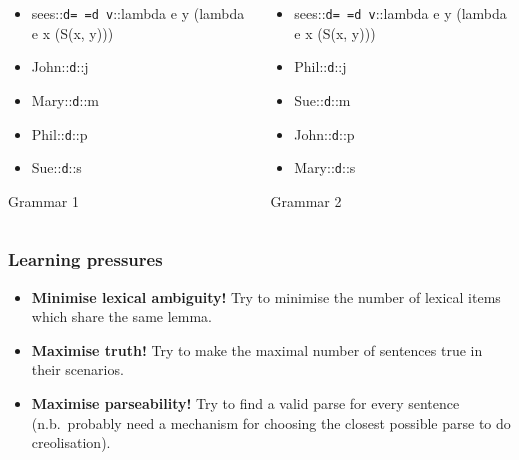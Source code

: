 \documentclass[aspectratio=169]{beamer}
\newcommand{\lex}[3]{{#1}::{\texttt{#2}}::{#3}}
\begin{document}
\begin{frame}
  \begin{columns}
  \begin{column}{0.5\textwidth}
  \begin{itemize}
    \item \lex{sees}{d=~=d~v}{lambda e y (lambda e x (S(x, y)))}
    \item \lex{John}{d}{j}
    \item \lex{Mary}{d}{m}
    \item \lex{Phil}{d}{p}
    \item \lex{Sue}{d}{s}
  \end{itemize}
  {Grammar 1}
  \end{column}
  \begin{column}{0.5\textwidth}
  \begin{itemize}
    \item \lex{sees}{d=~=d~v}{lambda e y (lambda e x (S(x, y)))}
    \item \lex{Phil}{d}{j}
    \item \lex{Sue}{d}{m}
    \item \lex{John}{d}{p}
    \item \lex{Mary}{d}{s}
  \end{itemize}
  {Grammar 2}
  \end{column}

  \end{columns}
\end{frame}
%
%
\begin{frame}
\frametitle{Learning pressures}
\begin{itemize}
  \item \textbf{Minimise lexical ambiguity!} Try to minimise the number of lexical items which share the same lemma.
  \item \textbf{Maximise truth!} Try to make the maximal number of sentences true in their scenarios.
  \item \textbf{Maximise parseability!} Try to find a valid parse for every sentence (n.b.\ probably need a mechanism for choosing the closest possible parse to do creolisation).
\end{itemize}
\end{frame}
%
%
%
%
%

\end{document}
